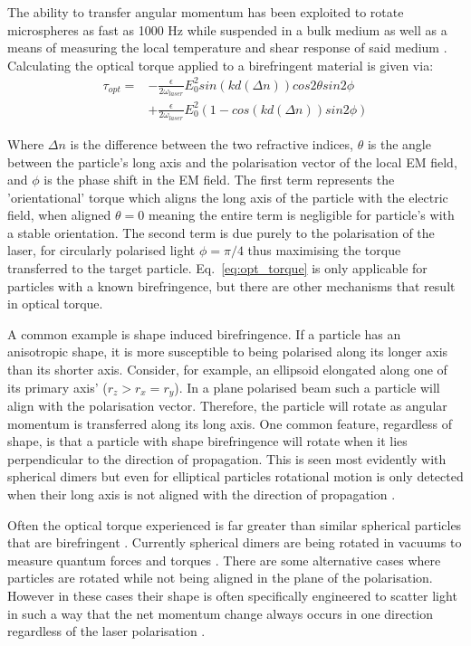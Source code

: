 The ability to transfer angular momentum has been exploited 
to rotate microspheres as fast as 1000 Hz while suspended 
in a bulk medium \cite{Arita2016} as well as a means of 
measuring the local temperature and shear response of said 
medium \cite{Millen2014, RodriguezSevilla2018}. Calculating 
the optical torque applied to a birefringent material is given 
via:
\begin{equation}
	\label{eq:opt_torque}
	\begin{aligned}
		\tau_{opt} =& -\frac{\epsilon}{2\omega_{laser}}E_0^2sin(kd(\Delta n))cos2\theta sin2\phi 
		\\ &+  \frac{\epsilon}{2\omega_{laser}}E_0^2 (1-cos(kd(\Delta n))sin2\phi)
	\end{aligned}
\end{equation}

Where $\Delta n$ is the difference between the two refractive 
indices, $\theta$ is the angle between the particle's long 
axis and the polarisation vector of the local EM field, and 
$\phi$ is the phase shift in the EM field. The first term 
represents the 'orientational' torque which aligns the long 
axis of the particle with the electric field, when aligned 
$\theta=0$ meaning the entire term is negligible for particle's 
with a stable orientation. The second term is due purely to the 
polarisation of the laser, for circularly polarised light 
$\phi=\pi/4$ thus maximising the torque transferred to the 
target particle. Eq.~\eqref{eq:opt_torque} is only applicable 
for particles with a known birefringence, but there are other 
mechanisms that result in optical torque.

A common example is shape induced birefringence. If a particle 
has an anisotropic shape, it is more susceptible to being 
polarised along its longer axis than its shorter axis. Consider, 
for example, an ellipsoid elongated along one of its primary 
axis' ($r_z > r_x = r_y$). In a plane polarised beam such a 
particle will align with the polarisation vector. Therefore, 
the particle will rotate as angular momentum is transferred 
along its long axis. One common feature, regardless of shape,
is that a particle with shape birefringence will rotate when 
it lies perpendicular to the direction of propagation. This 
is seen most evidently with spherical dimers \cite{Ahn2018, 
Reimann2018} but even for elliptical particles rotational 
motion is only detected when their long axis is not aligned 
with the direction of propagation \cite{Zhu2021, Mihiretie2014}.

Often the optical torque experienced is far greater than similar 
spherical particles that are birefringent \cite{Bruce2020}. 
Currently spherical dimers are being rotated in vacuums to 
measure quantum forces and torques \cite{Ahn2018, Reimann2018}. 
There are some alternative cases where particles are rotated 
while not being aligned in the plane of the polarisation. However 
in these cases their shape is often specifically engineered to 
scatter light in such a way that the net momentum change always
occurs in one direction regardless of the laser polarisation 
\cite{Higurashi1994}. 

